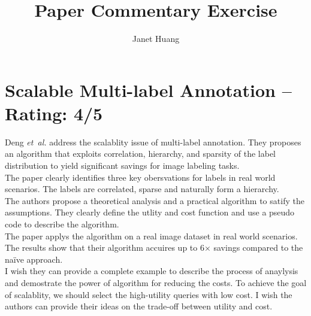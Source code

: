 \documentclass[a4paper]{article}
\title{Paper Commentary Exercise}
\author{Janet Huang}
\begin{document}
\maketitle
\section{Scalable Multi-label Annotation -- Rating: 4/5}
Deng \emph{et~al.} \cite{Deng2014} address the scalablity issue of multi-label annotation. They proposes an algorithm that exploits correlation, hierarchy, and sparsity of the label distribution to yield significant savings for image labeling tasks.\\

The paper clearly identifies three key obersvations for labels in real world scenarios. The labels are correlated, sparse and naturally form a hierarchy.\\

The authors propose a theoretical analysis and a practical algorithm to satify the assumptions. They clearly define the utlity and cost function and use a pseudo code to describe the algorithm.\\

The paper applys the algorithm on a real image dataset in real world scenarios. The results show that their algorithm accuires up to 6× savings compared to the na\"{i}ve approach.\\

I wish they can provide a complete example to describe the process of anaylysis and demostrate the power of algorithm for reducing the costs. To achieve the goal of scalablity, we should select the high-utility queries with low cost. I wish the authors can provide their ideas on the trade-off between utility and cost.




\end{document}
